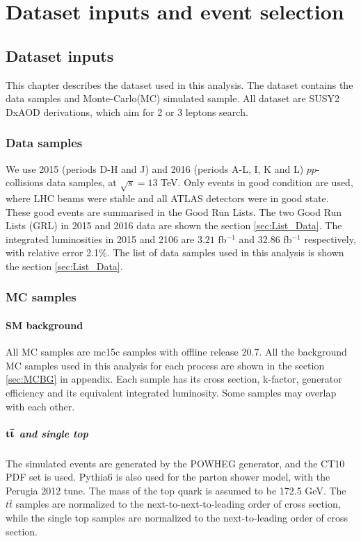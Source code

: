 \chapter{Dataset inputs and event selection}
\label{ch:event}

\section{Dataset inputs}
This chapter describes the dataset used in this analysis.
The dataset contains the data samples and Monte-Carlo(MC) simulated sample.
All dataset are SUSY2 DxAOD derivations, which aim for 2 or 3 leptons search.

\subsection{Data samples}
We use 2015 (periods D-H and J) and 2016 (periods A-L, I, K and L) $pp$-collisions data samples, at $\sqrt s=13$ TeV.
Only events in good condition are used, where LHC beams were stable and all ATLAS detectors were in good state.
These good events are summarised in the Good Run Lists.
The two Good Run Lists (GRL) in 2015 and 2016 data are shown the section \ref{sec:List_Data}.
The integrated luminosities in 2015 and 2106 are $3.21$ fb$^{-1}$ and $32.86$ fb$^{-1}$ respectively, with relative error 2.1\%.
The list of data samples used in this analysis is shown the section \ref{sec:List_Data}.

\subsection{MC samples}
\subsubsection{SM background}
All MC samples are mc15c samples with offline release 20.7.
All the background MC samples used in this analysis for each process are shown in the section \ref{sec:MCBG} in appendix.
Each sample has its cross section, k-factor, generator efficiency and its equivalent integrated luminosity.
Some samples may overlap with each other.

\paragraph{$\bf t\bar{t}$ and single top}
The simulated events are generated by the {\sc POWHEG} generator, and the CT10 PDF set is used.
{\sc Pythia6} is also used for the parton shower model, with the {\sc Perugia} 2012 tune.
The mass of the top quark is assumed to be 172.5 GeV.
The $t\bar{t}$ samples are normalized to the next-to-next-to-leading order of cross section, while the single top samples are normalized to the next-to-leading order of cross section.

